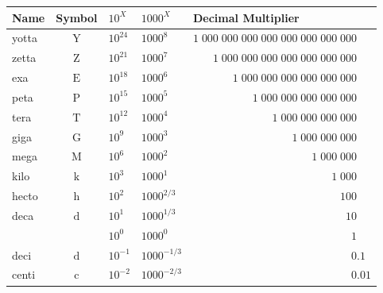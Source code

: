 \begin{tabular}{|l|c|l|l|l|}
    \hline
    Name & Symbol & ${10}^X$ & ${1000}^X$ & Decimal Multiplier \\
    \hline
    \hline
    yotta & $\si{\yotta} $ & ${10}^{ 24}$ & ${1000}^{ 8  }$ & $1\;000\;000\;000\;000\;000\;000\;000\;000$ \\ \cline{5-5}
    zetta & $\si{\zetta} $ & ${10}^{ 21}$ & ${1000}^{ 7  }$ & $\phantom{0\;00}1\;000\;000\;000\;000\;000\;000\;000$ \\ \cline{5-5}
    exa   & $\si{\exa  } $ & ${10}^{ 18}$ & ${1000}^{ 6  }$ & $\phantom{0\;000\;00}1\;000\;000\;000\;000\;000\;000$ \\ \cline{5-5}
    peta  & $\si{\peta } $ & ${10}^{ 15}$ & ${1000}^{ 5  }$ & $\phantom{0\;000\;000\;00}1\;000\;000\;000\;000\;000$ \\ \cline{5-5}
    tera  & $\si{\tera } $ & ${10}^{ 12}$ & ${1000}^{ 4  }$ & $\phantom{0\;000\;000\;000\;00}1\;000\;000\;000\;000$ \\ \cline{5-5}
    giga  & $\si{\giga } $ & ${10}^{  9}$ & ${1000}^{ 3  }$ & $\phantom{0\;000\;000\;000\;000\;00}1\;000\;000\;000$ \\ \cline{5-5}
    mega  & $\si{\mega } $ & ${10}^{  6}$ & ${1000}^{ 2  }$ & $\phantom{0\;000\;000\;000\;000\;000\;00}1\;000\;000$ \\ \cline{5-5}
    kilo  & $\si{\kilo } $ & ${10}^{  3}$ & ${1000}^{ 1  }$ & $\phantom{0\;000\;000\;000\;000\;000\;000\;00}1\;000$ \\ \hline
    hecto & $\si{\hecto} $ & ${10}^{  2}$ & ${1000}^{ 2/3}$ & $\phantom{0\;000\;000\;000\;000\;000\;000\;000}\;100$ \\ \cline{5-5}
    deca  & $\si{\deca } $ & ${10}^{  1}$ & ${1000}^{ 1/3}$ & $\phantom{0\;000\;000\;000\;000\;000\;000\;000\;0}10$ \\ \hline
          &                & ${10}^{  0}$ & ${1000}^{ 0  }$ & $\phantom{0\;000\;000\;000\;000\;000\;000\;000\;00}1$ \\ \hline
    deci  & $\si{\deci } $ & ${10}^{ -1}$ & ${1000}^{-1/3}$ & $\phantom{0\;000\;000\;000\;000\;000\;000\;000\;00}
                                                                        0.1$ \\ \cline{5-5}
    centi & $\si{\centi} $ & ${10}^{ -2}$ & ${1000}^{-2/3}$ & $\phantom{0\;000\;000\;000\;000\;000\;000\;000\;00}
                                                                        0.01$ \\ \hline

\end{tabular}
